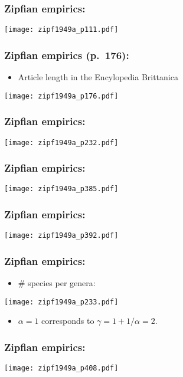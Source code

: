\begin{frame}
  \frametitle{Zipfian empirics:}

  \centering
  \texttt{[image: zipf1949a\_p111.pdf]}

\end{frame}

\begin{frame}
  \frametitle{Zipfian empirics (p.\ 176):}

  \begin{itemize}
  \item Article length in the Encylopedia Brittanica
  \end{itemize}
  \centering
  \texttt{[image: zipf1949a\_p176.pdf]}

\end{frame}

\begin{frame}
  \frametitle{Zipfian empirics:}

  \centering
  \texttt{[image: zipf1949a\_p232.pdf]}

\end{frame}

\begin{frame}
  \frametitle{Zipfian empirics:}

  \centering
  \texttt{[image: zipf1949a\_p385.pdf]}

\end{frame}

\begin{frame}
  \frametitle{Zipfian empirics:}

  \centering
  \texttt{[image: zipf1949a\_p392.pdf]}

\end{frame}

\begin{frame}
  \frametitle{Zipfian empirics:}

  \begin{itemize}
  \item \# species per genera:
  \end{itemize}
  \centering
  \texttt{[image: zipf1949a\_p233.pdf]}
  \begin{itemize}
  \item $\alpha=1$ corresponds to $\gamma=1+1/\alpha=2$.
  \end{itemize}

\end{frame}

\begin{frame}
  \frametitle{Zipfian empirics:}

  \centering
  \texttt{[image: zipf1949a\_p408.pdf]}

\end{frame}

